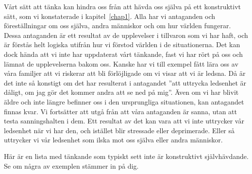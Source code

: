 \documentclass[swedish,a4paper]{book}
\begin{document}

Vårt sätt att tänka kan hindra oss från att hävda oss själva på ett konstruktivt sätt, som vi konstaterade i kapitel~\ref{chap1}. Alla har vi antaganden och föreställningar om oss själva, andra människor och om hur världen fungerar. Dessa antaganden är ett resultat av de upplevelser i tillvaron som vi har haft, och är förstås helt logiska utifrån hur vi förstod världen i de situationerna. Det kan dock hända att vi inte har uppdaterat vårt tänkande, fast vi har rört på oss och lämnat de upplevelserna bakom oss. Kanske har vi till exempel fått lära oss av våra familjer att vi riskerar att bli förlöjligade om vi visar att vi är ledsna. Då är det inte så konstigt om det har resulterat i antagandet ''att uttrycka ledsenhet är dåligt, om jag gör det kommer andra att se ned på mig''. Även om vi har blivit äldre och inte längre befinner oss i den ursprungliga situationen, kan antagandet finnas kvar. Vi fortsätter att utgå från att våra antaganden är sanna, utan att testa sanningshalten i dem. Ett resultat av det kan vara att vi inte uttrycker vår ledsenhet när vi har den, och istället blir stressade eller deprimerade. %
Eller så uttrycker vi vår ledsenhet som ilska mot oss själva eller andra människor.

Här är en lista med tänkande som typiskt sett inte är konstruktivt självhävdande. Se om några av exemplen stämmer in på dig.
\end{document}
